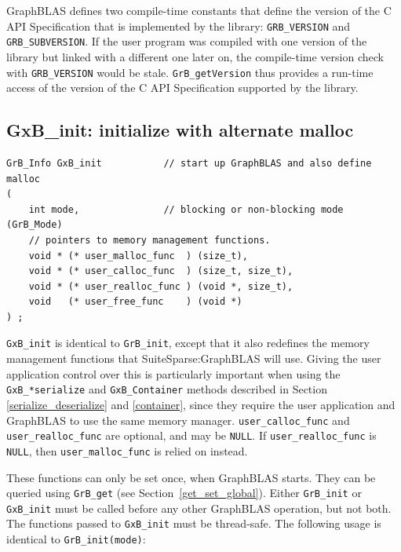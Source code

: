 GraphBLAS defines two compile-time constants that
define the version of the C API Specification
that is implemented by the library:
\verb'GRB_VERSION' and \verb'GRB_SUBVERSION'.
If the user program was compiled with one
version of the library but linked with a different one later on, the
compile-time version check with \verb'GRB_VERSION' would be stale.
\verb'GrB_getVersion' thus provides a run-time access of the version of the C
API Specification supported by the library.

\subsection{{\sf GxB\_init:} initialize with alternate malloc} %
\label{xinit}

\begin{mdframed}[userdefinedwidth=6in]
{\footnotesize
\begin{verbatim}
GrB_Info GxB_init           // start up GraphBLAS and also define malloc
(
    int mode,               // blocking or non-blocking mode (GrB_Mode)
    // pointers to memory management functions.
    void * (* user_malloc_func  ) (size_t),
    void * (* user_calloc_func  ) (size_t, size_t),
    void * (* user_realloc_func ) (void *, size_t),
    void   (* user_free_func    ) (void *)
) ;
\end{verbatim}
}\end{mdframed}

\verb'GxB_init' is identical to \verb'GrB_init', except that it also redefines
the memory management functions that SuiteSparse:GraphBLAS will use.  Giving
the user application control over this is particularly important when using the
\verb'GxB_*serialize' and \verb'GxB_Container' methods described in Section
\ref{serialize_deserialize} and \ref{container}, since they require the user
application and GraphBLAS to use the same memory manager.
\verb'user_calloc_func' and \verb'user_realloc_func' are optional, and may be
\verb'NULL'.  If \verb'user_realloc_func' is \verb'NULL', then
\verb'user_malloc_func' is relied on instead.

These functions can only be set once, when GraphBLAS starts.  They can be
queried using \verb'GrB_get' (see Section~\ref{get_set_global}).  Either
\verb'GrB_init' or \verb'GxB_init' must be called before any other GraphBLAS
operation, but not both.  The functions passed to \verb'GxB_init' must be
thread-safe.  The following usage is identical to \verb'GrB_init(mode)':

